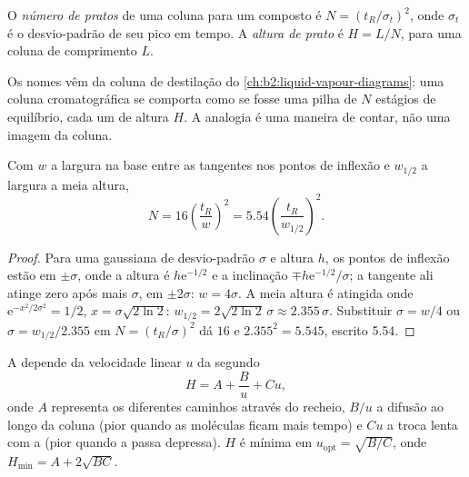 \begin{definition}\label{def:b2:chromatography:plates}
O \emph{número de pratos} de uma coluna para um composto é $N = (t_R/\sigma_t)^2$, onde
$\sigma_t$ é o desvio-padrão de seu pico em tempo. A \emph{altura de prato} é
$H = L/N$, para uma coluna de comprimento $L$.
\end{definition}

Os nomes vêm da coluna de destilação do \cref{ch:b2:liquid-vapour-diagrams}: uma coluna
cromatográfica se comporta como se fosse uma pilha de $N$ estágios de equilíbrio, cada um de altura $H$.
A analogia é uma maneira de contar, não uma imagem da coluna.

\begin{proposition}\label{prop:b2:chromatography:plate-number}
Com $w$ a largura na base entre as tangentes nos pontos de inflexão e $w_{1/2}$ a largura a
meia altura,
\begin{equation*}
N = 16\left(\frac{t_R}{w}\right)^2 = 5.54\left(\frac{t_R}{w_{1/2}}\right)^2.
\end{equation*}
\end{proposition}

\begin{proof}
Para uma gaussiana de desvio-padrão $\sigma$ e altura $h$, os pontos de inflexão estão em $\pm\sigma$,
onde a altura é $h\mathrm e^{-1/2}$ e a inclinação $\mp h\mathrm e^{-1/2}/\sigma$; a tangente ali
atinge zero após mais $\sigma$, em $\pm2\sigma$: $w = 4\sigma$. A meia altura é atingida onde
$\mathrm e^{-x^2/2\sigma^2} = 1/2$, $x = \sigma\sqrt{2\ln2}$: $w_{1/2} = 2\sqrt{2\ln2}\,\sigma \approx
2.355\,\sigma$. Substituir $\sigma = w/4$ ou $\sigma = w_{1/2}/2.355$ em $N = (t_R/\sigma)^2$ dá
$16$ e $2.355^2 = 5.545$, escrito 5.54.
\end{proof}

\begin{proposition}\label{prop:b2:chromatography:van-deemter}
A  depende da velocidade linear $u$ da  segundo
\begin{equation*}
H = A + \frac{B}{u} + Cu,
\end{equation*}
onde $A$ representa os diferentes caminhos através do recheio, $B/u$ a difusão ao longo da coluna
(pior quando as moléculas ficam mais tempo) e $Cu$ a troca lenta com a  (pior
quando a  passa depressa). $H$ é mínima em $u_{\mathrm{opt}} = \sqrt{B/C}$, onde $H_{\min} =
A + 2\sqrt{BC}$.
\end{proposition}

